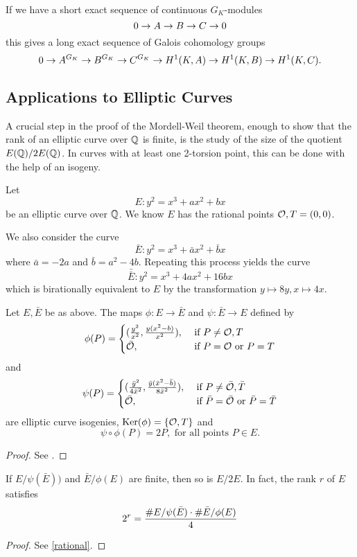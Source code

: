 \documentclass[12pt, a4paper]{amsart}
\begin{document}
If we have a short exact sequence of continuous $G_K$-modules
\[ 0 \rightarrow A \rightarrow B \rightarrow C \rightarrow 0\]
this gives a long exact sequence of Galois cohomology groups
\[0 \rightarrow A^{G_K} \rightarrow B^{G_K} \rightarrow C^{G_K} \rightarrow H^1(K,A) \rightarrow H^1(K,B) \rightarrow H^1(K,C).\]


\subsection{Applications to Elliptic Curves} \label{sec:applications}
A crucial step in the proof of the Mordell-Weil theorem, enough to show that
the rank of an elliptic curve over ${\mathbb Q}$ is finite, is the study of the size
of the quotient $E({\mathbb Q}) / 2 E({\mathbb Q})$. In curves with at least one 2-torsion
point, this can be done with the help of an isogeny.

Let $$E : y^2 = x^3 + ax^2 + bx$$ be an elliptic curve over ${\mathbb Q}$. We know $E$
has the rational points ${\mathcal O}, T = (0,0)$.

We also consider the curve
\[ \bar{E} : y^2 = x^3 + \bar{a}x^2 + \bar{b}x \]
where $\bar{a} = -2a$ and $\bar{b} = a^2 - 4b$. Repeating this process yields
the curve
\[ \bar{\bar{E}} : y^2 = x^3 +  4ax^2 + 16bx\]
which is birationally equivalent to $E$ by the transformation $y \mapsto 8y,
x \mapsto 4x$.

\begin{prop}
  Let $E, \bar{E}$ be as above. The maps $\phi : E \rightarrow \bar{E}$ and
  $\psi : \bar{E} \rightarrow E$ defined by
  \[\phi(P) =
    \begin{cases}
      (\frac{y^2}{x^2}, \frac{y(x^2-b)}{x^2}), & \text{ if } P \neq {\mathcal O}, T \\
      \bar{{\mathcal O}}, & \text{ if } P = {\mathcal O} \text{ or } P = T
    \end{cases}\]
  and
  \[\psi(P) =
    \begin{cases}
      (\frac{\bar{y}^2}{4\bar{x}^2}, \frac{\bar{y}(\bar{x}^2-\bar{b})}{8\bar{x}^2}),
      & \text{ if } P \neq \bar{{\mathcal O}}, \bar{T} \\
      \bar{{\mathcal O}}, & \text{ if } \bar{P} = \bar{{\mathcal O}} \text{ or } \bar{P} = \bar{T}
    \end{cases}\]
  are elliptic curve isogenies, $\text{Ker}(\phi) = \{{\mathcal O}, T\}$ and
  \[ \psi \circ \phi (P) = 2P , \text{ for all points } P \in E.\]
\end{prop}
\begin{proof}
  See \cite[See][Chapter 4, page 79]{rational}.
\end{proof}

\begin{lemma} \label{lemma:rankformula}
  If $E / \psi(\bar{E}))$ and $\bar{E} / \phi(E)$ are finite, then so is $E/2E$.
  In fact, the rank $r$ of $E$ satisfies
  \[2^r = \frac{\#E/\psi(\bar{E}) \cdot \#\bar{E}/\phi(E)}{4}\]
\end{lemma}
\begin{proof}
  See \ref{rational}.
\end{proof}
\end{document}
